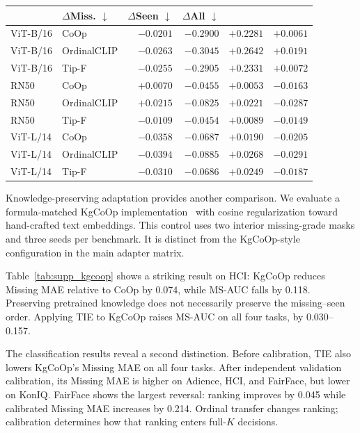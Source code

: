 \begin{table}[!t]
\begin{minipage}[t]{0.48\textwidth}
\begin{tabular*}{\linewidth}{@{\extracolsep{\fill}}llrrrr@{}}
& \shortstack{$\Delta$Miss.\\$\downarrow$}
& \shortstack{$\Delta$Seen\\$\downarrow$}
& \shortstack{$\Delta$All\\$\downarrow$} \\
\midrule
ViT-B/16 & CoOp
& $-0.0201$ & $-0.2900$ & $+0.2281$ & $+0.0061$ \\
ViT-B/16 & OrdinalCLIP
& $-0.0263$ & $-0.3045$ & $+0.2642$ & $+0.0191$ \\
ViT-B/16 & Tip-F
& $-0.0255$ & $-0.2905$ & $+0.2331$ & $+0.0072$ \\
\midrule
RN50 & CoOp
& $+0.0070$ & $-0.0455$ & $+0.0053$ & $-0.0163$ \\
RN50 & OrdinalCLIP
& $+0.0215$ & $-0.0825$ & $+0.0221$ & $-0.0287$ \\
RN50 & Tip-F
& $-0.0109$ & $-0.0454$ & $+0.0089$ & $-0.0149$ \\
\midrule
ViT-L/14 & CoOp
& $-0.0358$ & $-0.0687$ & $+0.0190$ & $-0.0205$ \\
ViT-L/14 & OrdinalCLIP
& $-0.0394$ & $-0.0885$ & $+0.0268$ & $-0.0291$ \\
ViT-L/14 & Tip-F
& $-0.0310$ & $-0.0686$ & $+0.0249$ & $-0.0187$ \\
\bottomrule
\end{tabular*}
\end{minipage}
\end{table}

Knowledge-preserving adaptation provides another comparison. We evaluate a formula-matched KgCoOp implementation~\cite{yao2023kgcoop} with cosine regularization toward hand-crafted text embeddings. This control uses two interior missing-grade masks and three seeds per benchmark. It is distinct from the KgCoOp-style configuration in the main adapter matrix.

Table~\ref{tab:supp_kgcoop} shows a striking result on HCI: KgCoOp reduces Missing MAE relative to CoOp by 0.074, while MS-AUC falls by 0.118. Preserving pretrained knowledge does not necessarily preserve the missing--seen order. Applying TIE to KgCoOp raises MS-AUC on all four tasks, by 0.030--0.157.

The classification results reveal a second distinction. Before calibration, TIE also lowers KgCoOp's Missing MAE on all four tasks. After independent validation calibration, its Missing MAE is higher on Adience, HCI, and FairFace, but lower on KonIQ. FairFace shows the largest reversal: ranking improves by 0.045 while calibrated Missing MAE increases by 0.214. Ordinal transfer changes ranking; calibration determines how that ranking enters full-$K$ decisions.



